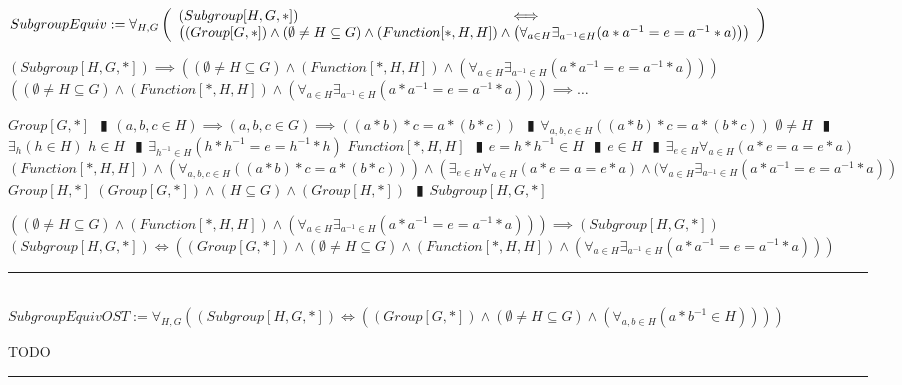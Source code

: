 \documentclass{book}
\newcommand{\abr}{:=}
\newcommand{\pipe}{$\phantom{(}\vrectangleblack\phantom{)}$}
\newcommand{\pr}[1]{\left(#1\right)}
\begin{document}
$SubgroupEquiv \abr \forall_{H, G}\left(\begin{array}{ll}
  (Subgroup[H, G, *]) \hfill \iff \hfill \\
  \pr{(Group[G, *]) \land (\emptyset \neq H \subseteq G) \land (Function[*, H, H]) \land \pr{\forall_{a \in H} \exists_{a^{-1} \in H}(a * a^{-1} = e = a^{-1} * a)}}
\end{array}\right)$
\begin{enumerate}
  \lit $(Subgroup[H, G, *]) \implies \pr{(\emptyset \neq H \subseteq G) \land (Function[*, H, H]) \land \pr{\forall_{a \in H} \exists_{a^{-1} \in H}(a * a^{-1} = e = a^{-1} * a)}}$
  \lit $\pr{(\emptyset \neq H \subseteq G) \land (Function[*, H, H]) \land \pr{\forall_{a \in H} \exists_{a^{-1} \in H}(a * a^{-1} = e = a^{-1} * a)}} \implies \ldots$
  \begin{enumerate}
    \lit $Group[G, *]$ \pipe $(a, b, c \in H) \implies (a, b, c \in G) \implies \pr{(a * b) * c = a * (b * c)}$ \pipe $\forall_{a, b, c \in H}\pr{(a * b) * c = a * (b * c)}$
    \lit $\emptyset \neq H$ \pipe $\exists_{h}(h \in H)$
    \lit $h \in H$ \pipe $\exists_{h^{-1} \in H}(h * h^{-1} = e = h^{-1} * h)$
    \lit $Function[*, H, H]$ \pipe $e = h * h^{-1} \in H$ \pipe $e \in H$ \pipe $\exists_{e \in H} \forall_{a \in H}(a * e = a = e * a)$
    \lit $(Function[*, H, H]) \land \pr{\forall_{a, b, c \in H}\pr{(a * b) * c = a * (b * c)}} \land \pr{\exists_{e \in H} \forall_{a \in H}(a * e = a = e * a) \land (\forall_{a \in H} \exists_{a^{-1} \in H}(a * a^{-1} = e = a^{-1} * a)}$
    \lit $Group[H, *]$
    \lit $(Group[G, *]) \land (H \subseteq G) \land (Group[H, *])$ \pipe $Subgroup[H, G, *]$
  \end{enumerate}
  \lit $\pr{(\emptyset \neq H \subseteq G) \land (Function[*, H, H]) \land \pr{\forall_{a \in H} \exists_{a^{-1} \in H}(a * a^{-1} = e = a^{-1} * a)}} \implies (Subgroup[H, G, *])$
  \lit $(Subgroup[H, G, *]) \iff \pr{(Group[G, *]) \land (\emptyset \neq H \subseteq G) \land (Function[*, H, H]) \land \pr{\forall_{a \in H} \exists_{a^{-1} \in H}(a * a^{-1} = e = a^{-1} * a)}}$
\end{enumerate} \vspace{.75mm} \hrule \vspace{.75mm} \ \\

$SubgroupEquivOST \abr \forall_{H, G}\pr{(Subgroup[H, G, *]) \iff \pr{(Group[G, *]) \land (\emptyset \neq H \subseteq G) \land \pr{\forall_{a, b \in H}(a * b^{-1} \in H)}}}$
\begin{enumerate}
  \lit TODO
\end{enumerate} \vspace{.75mm} \hrule \vspace{.75mm} \ \\
\end{document}
